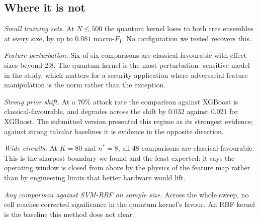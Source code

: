 \subsection{Where it is not}
\begin{revbody}

\emph{Small training sets.} At $N\leq500$ the quantum kernel loses to both tree
ensembles at every size, by up to $0.081$ macro-$F_{1}$. No configuration we
tested recovers this.

\emph{Feature perturbation.} Six of six comparisons are classical-favourable
with effect sizes beyond $2.8$. The quantum kernel is the most perturbation-%
sensitive model in the study, which matters for a security application where
adversarial feature manipulation is the norm rather than the exception.

\emph{Strong prior shift.} At a $70\%$ attack rate the comparison against
XGBoost is classical-favourable, and \QSVM{} degrades across the shift by
$0.032$ against $0.021$ for XGBoost. The submitted version presented this regime
as its strongest evidence; against strong tabular baselines it is evidence in
the opposite direction.

\emph{Wide circuits.} At $K=80$ and $n^{\ast}=8$, all $48$ comparisons are
classical-favourable. This is the sharpest boundary we found and the least
expected: it says the operating window is closed from above by the physics of
the feature map rather than by engineering limits that better hardware would
lift.

\emph{Any comparison against SVM-RBF on sample size.} Across the whole sweep, no
cell reaches corrected significance in the quantum kernel's favour. An RBF
kernel is the baseline this method does not clear.
\end{revbody}

